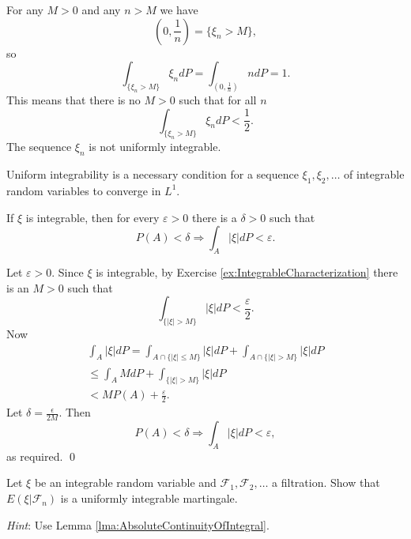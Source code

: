 \begin{Solution}
\label{sol:Exercise44}
For any $M > 0$ and any $n > M$ we have
\[
(0, \frac{1}{n}) = \{\xi_{n} > M\},
\]
so
\[
\int_{\{\xi_{n} > M\}} \xi_{n} d P = \int_{(0, \frac{1}{n})} n d P = 1.
\]
This means that there is no $M > 0$ such that for all $n$
\[
\int_{\{\xi_{n} > M\}} \xi_{n} d P < \frac{1}{2}.
\]
The sequence $\xi_{n}$ is not uniformly integrable.
\end{Solution}

\begin{Proposition}
\label{prop:UniformIntegrabilityNecessary}
Uniform integrability is a necessary condition for a sequence $\xi_1, \xi_2, \ldots$ of integrable random variables to converge in $L^1$.
\end{Proposition}

\begin{Lemma}
\label{lma:AbsoluteContinuityOfIntegral}
If $\xi$ is integrable, then for every $\varepsilon > 0$ there is a $\delta > 0$ such that
\[
P (A) < \delta \Longrightarrow \int_{A} | \xi | d P < \varepsilon .
\]
\end{Lemma}

\begin{Proof}
Let $\varepsilon > 0$. Since $\xi$ is integrable, by Exercise \ref{ex:IntegrableCharacterization} there is an $M > 0$ such that
\[
\int_{\{| \xi | > M \}} | \xi | d P < \frac{\varepsilon}{2}.
\]
Now
\[
\begin{array}{l}
\int_{A} | \xi | d P = \int_{A \cap \{| \xi | \leq M \}} | \xi | d P + \int_{A \cap \{| \xi | > M \}} | \xi | d P \\
\leq \int_{A} M d P + \int_{\{| \xi | > M \}} | \xi | d P \\
< M P (A) + \frac{\varepsilon}{2}.
\end{array}
\]
Let $\delta = \frac{\epsilon}{2M}$. Then
\[
P (A) < \delta \Longrightarrow \int_{A} | \xi | d P < \varepsilon ,
\]
as required. \qed
\end{Proof}

\begin{Exercise}
\label{ex:ConditionalExpectationUniformlyIntegrable}
Let $\xi$ be an integrable random variable and $\mathcal{F}_1, \mathcal{F}_2, \ldots$ a filtration. Show that $E(\xi | \mathcal{F}_n)$ is a uniformly integrable martingale.

\textit{Hint}: Use Lemma \ref{lma:AbsoluteContinuityOfIntegral}.
\end{Exercise}

